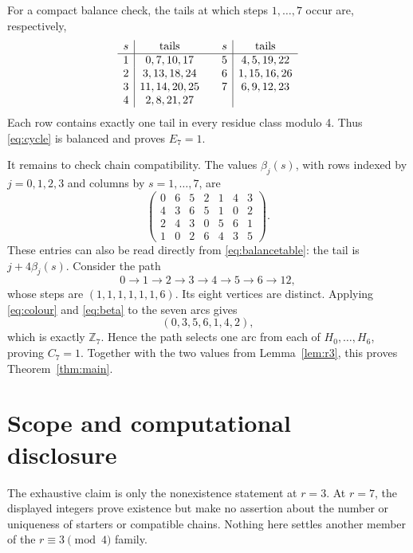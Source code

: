 \documentclass[11pt]{article}
\newcommand{\Z}{\mathbb Z}
\begin{document}
For a compact balance check, the tails at which steps \(1,\ldots,7\) occur
are, respectively,
\begin{equation}\label{eq:balancetable}
\begin{array}{c|c@{\qquad}c|c}
s&\text{tails}&s&\text{tails}\\ \hline
1&0,7,10,17 & 5&4,5,19,22\\
2&3,13,18,24& 6&1,15,16,26\\
3&11,14,20,25&7&6,9,12,23\\
4&2,8,21,27&&
\end{array}
\end{equation}
Each row contains exactly one tail in every residue class modulo 4.  Thus
\eqref{eq:cycle} is balanced and proves \(E_7=1\).

It remains to check chain compatibility.  The values \(\beta_j(s)\), with
rows indexed by \(j=0,1,2,3\) and columns by \(s=1,\ldots,7\), are
\begin{equation}\label{eq:beta}
\begin{pmatrix}
0&6&5&2&1&4&3\\
4&3&6&5&1&0&2\\
2&4&3&0&5&6&1\\
1&0&2&6&4&3&5
\end{pmatrix}.
\end{equation}
These entries can also be read directly from \eqref{eq:balancetable}: the
tail is \(j+4\beta_j(s)\).  Consider the path
\begin{equation}\label{eq:path}
  0\longrightarrow1\longrightarrow2\longrightarrow3\longrightarrow4
  \longrightarrow5\longrightarrow6\longrightarrow12,
\end{equation}
whose steps are \((1,1,1,1,1,1,6)\).  Its eight vertices are distinct.
Applying \eqref{eq:colour} and \eqref{eq:beta} to the seven arcs gives
\begin{equation}\label{eq:colours}
  (0,3,5,6,1,4,2),
\end{equation}
which is exactly \(\Z_7\).  Hence the path selects one arc from each of
\(H_0,\ldots,H_6\), proving \(C_7=1\).  Together with the two values from
Lemma~\ref{lem:r3}, this proves Theorem~\ref{thm:main}.

\section{Scope and computational disclosure}

The exhaustive claim is only the nonexistence statement at \(r=3\).  At
\(r=7\), the displayed integers prove existence but make no assertion about
the number or uniqueness of starters or compatible chains.  Nothing here
settles another member of the \(r\equiv3\pmod4\) family.
\end{document}

